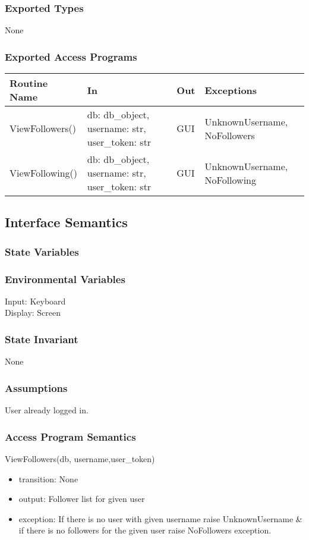 \documentclass[12pt, titlepage]{article}
\begin{document}
\subsubsection* {Exported Types}
None

\subsubsection* {Exported Access Programs}
\begin{table}[!htb]
    \centering
    \begin{tabular}{|p{3cm}|p{3cm}|p{3cm}|p{4.5cm}|}
        \hline
        \textbf{Routine Name} & \textbf{In} & \textbf{Out} & \textbf{Exceptions} \\
        \hline
         ViewFollowers() & db: db\_object, username: str, user\_token: str  & GUI & UnknownUsername, NoFollowers\\
        \hline
         ViewFollowing() & db: db\_object, username: str, user\_token: str  & GUI & UnknownUsername, NoFollowing\\
        \hline
    \end{tabular}
\end{table}

\subsection{Interface Semantics}
\subsubsection{State Variables}

\subsubsection{Environmental Variables}
Input: Keyboard\\
Display: Screen


\subsubsection{State Invariant}
None

\subsubsection{Assumptions}
User already logged in.

\subsubsection{Access Program Semantics}
ViewFollowers(db, username,user\_token)
\begin{itemize}
    \item transition: None
    \item output: Follower list for given user
    \item exception: If there is no user with given username raise UnknownUsername \& if there is no followers for the given user raise NoFollowers exception.
\end{itemize}
\end{document}
